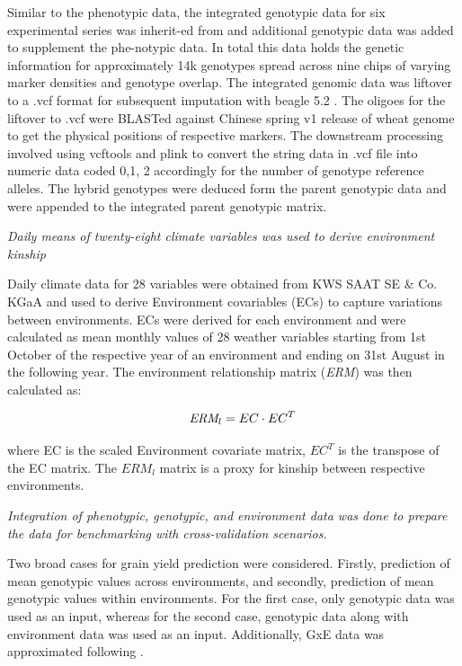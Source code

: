 \documentclass[english, biblatex]{lni}
\begin{document}
Similar to the phenotypic data, the integrated genotypic data for six experimental series was inherit-ed from \cite{zhao2021unlocking} and additional genotypic data was added to supplement the phe-notypic data. In total this data holds the genetic information for approximately 14k genotypes spread across nine chips of varying marker densities and genotype overlap. The integrated genomic data was liftover to a .vcf format \cite{danecek2011variant} for subsequent imputation with beagle 5.2 \cite{browning2018one}. The oligoes \cite{wang2014characterization} for the liftover to .vcf were BLASTed against Chinese spring v1 release of wheat genome to get the physical positions of respective markers. The downstream processing involved using vcftools \cite{danecek2011variant} and plink \cite{purcell2007plink} to convert the string data in .vcf file into numeric data coded 0,1, 2 accordingly for the number of genotype reference alleles. The hybrid genotypes were deduced form the parent genotypic data and were appended to the integrated parent genotypic matrix.

\textit{Daily means of twenty-eight climate variables was used to derive environment kinship}

Daily climate data for 28 variables were obtained from KWS SAAT SE \& Co. KGaA and used to derive Environment covariables (ECs) to capture variations between environments. ECs were derived for each environment and were calculated as mean monthly values of 28 weather variables starting from 1st October of the respective year of an environment and ending on 31st August in the following year.
The environment relationship matrix (\textit{ERM}) was then calculated as:

\begin{equation}
\hspace{0.5cm}\textit{ERM}_l = EC \cdot EC^T
\end{equation}

where EC is the scaled Environment covariate matrix, $EC^T$ is the transpose of the EC matrix. The $\textit{ERM}_l$ matrix is a proxy for kinship between respective environments.

\textit{Integration of phenotypic, genotypic, and environment data was done to prepare the data for benchmarking with cross-validation scenarios.}

Two broad cases for grain yield prediction were considered. Firstly, prediction of mean genotypic values across environments, and secondly, prediction of mean genotypic values within environments. For the first case, only genotypic data was used as an input, whereas for the second case, genotypic data along with environment data was used as an input. Additionally, GxE data was approximated following \cite{de2020data}.
\end{document}

